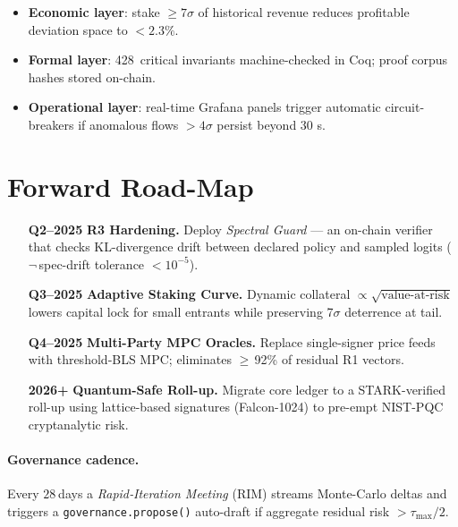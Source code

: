 \documentclass[11pt]{article}
\theoremstyle{plain}
\begin{document}
\begin{itemize}\itemsep2pt
\item \textbf{Economic layer}:
      stake $\ge 7\sigma$ of historical revenue
      reduces profitable deviation space to $<\!2.3\%$.
\item \textbf{Formal layer}:
      428~critical invariants machine-checked in Coq;
      proof corpus hashes stored on-chain.
\item \textbf{Operational layer}:
      real-time Grafana panels trigger automatic
      circuit-breakers if anomalous flows $>\!4\sigma$
      persist beyond 30 s.
\end{itemize}

\section{Forward Road-Map}\label{sec:roadmap}

\begin{enumerate}\itemsep2pt
\item[\textbf{Q2–2025}] \textbf{R3 Hardening.}  
      Deploy \emph{Spectral Guard} — an on-chain verifier that
      checks KL-divergence drift between declared policy and
      sampled logits ($\neg$\,spec-drift tolerance $<10^{-5}$).

\item[\textbf{Q3–2025}] \textbf{Adaptive Staking Curve.}  
      Dynamic collateral $\!\propto\!\sqrt{\text{value-at-risk}}$
      lowers capital lock for small entrants while
      preserving 7$\sigma$ deterrence at tail.

\item[\textbf{Q4–2025}] \textbf{Multi-Party MPC Oracles.}  
      Replace single-signer price feeds with threshold‐BLS MPC;
      eliminates $\ge$\,92\% of residual R1 vectors.

\item[\textbf{2026+}] \textbf{Quantum-Safe Roll-up.}  
      Migrate core ledger to a STARK-verified roll-up
      using lattice-based signatures (Falcon-1024) to
      pre-empt NIST-PQC cryptanalytic risk.
\end{enumerate}

\paragraph{Governance cadence.}
Every $28$ days a \emph{Rapid‐Iteration Meeting} (RIM)
streams Monte-Carlo deltas and triggers a
\texttt{governance.propose()} auto-draft if
aggregate residual risk $>\tau_{\text{max}}/2$.
\end{document}
